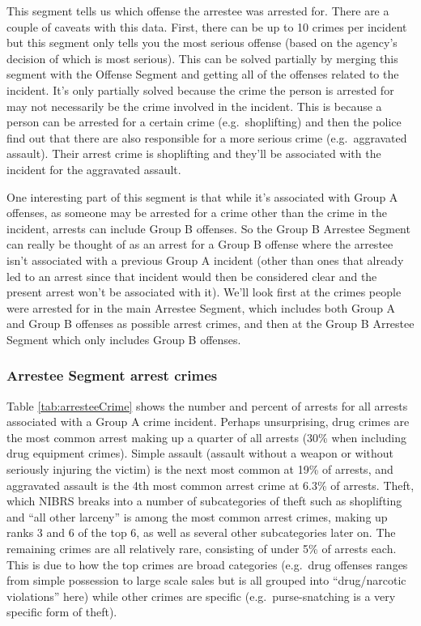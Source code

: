 \documentclass[
  12pt,
  openany]{book}
\begin{document}
This segment tells us which offense the arrestee was arrested for. There are a couple of caveats with this data. First, there can be up to 10 crimes per incident but this segment only tells you the most serious offense (based on the agency's decision of which is most serious). This can be solved partially by merging this segment with the Offense Segment and getting all of the offenses related to the incident. It's only partially solved because the crime the person is arrested for may not necessarily be the crime involved in the incident. This is because a person can be arrested for a certain crime (e.g.~shoplifting) and then the police find out that there are also responsible for a more serious crime (e.g.~aggravated assault). Their arrest crime is shoplifting and they'll be associated with the incident for the aggravated assault.

One interesting part of this segment is that while it's associated with Group A offenses, as someone may be arrested for a crime other than the crime in the incident, arrests can include Group B offenses. So the Group B Arrestee Segment can really be thought of as an arrest for a Group B offense where the arrestee isn't associated with a previous Group A incident (other than ones that already led to an arrest since that incident would then be considered clear and the present arrest won't be associated with it). We'll look first at the crimes people were arrested for in the main Arrestee Segment, which includes both Group A and Group B offenses as possible arrest crimes, and then at the Group B Arrestee Segment which only includes Group B offenses.

\hypertarget{arrestee-segment-arrest-crimes}{%
\subsubsection{Arrestee Segment arrest crimes}\label{arrestee-segment-arrest-crimes}}

Table \ref{tab:arresteeCrime} shows the number and percent of arrests for all arrests associated with a Group A crime incident. Perhaps unsurprising, drug crimes are the most common arrest making up a quarter of all arrests (30\% when including drug equipment crimes). Simple assault (assault without a weapon or without seriously injuring the victim) is the next most common at 19\% of arrests, and aggravated assault is the 4th most common arrest crime at 6.3\% of arrests. Theft, which NIBRS breaks into a number of subcategories of theft such as shoplifting and ``all other larceny'' is among the most common arrest crimes, making up ranks 3 and 6 of the top 6, as well as several other subcategories later on. The remaining crimes are all relatively rare, consisting of under 5\% of arrests each. This is due to how the top crimes are broad categories (e.g.~drug offenses ranges from simple possession to large scale sales but is all grouped into ``drug/narcotic violations'' here) while other crimes are specific (e.g.~purse-snatching is a very specific form of theft).
\end{document}
